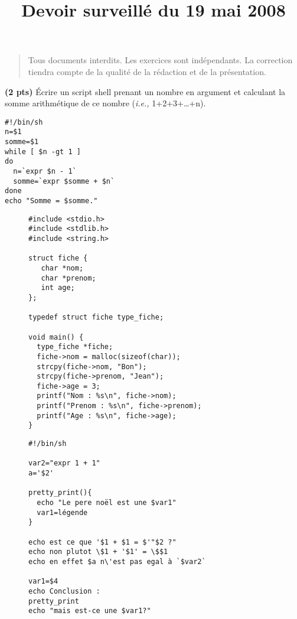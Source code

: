\documentclass[10pt]{article}
\title{Devoir surveillé du 19 mai 2008}
\begin{document}
\maketitle
\thispagestyle{empty}

\begin{quote}
  Tous documents interdits. Les exercices sont indépendants. La correction
  tiendra compte de la qualité de la rédaction et de la présentation.
\end{quote}

\begin{Exercice} \textbf{(2 pts)}
Écrire un script shell prenant un nombre en argument et calculant la somme
arithmétique de ce nombre (\textit{i.e.,} 1+2+3+\ldots+n).

\begin{Reponse}
  \begin{Verbatim}
#!/bin/sh
n=$1
somme=$1
while [ $n -gt 1 ]
do
  n=`expr $n - 1`
  somme=`expr $somme + $n`
done
echo "Somme = $somme."
  \end{Verbatim}
\end{Reponse}
\end{Exercice}

\begin{figure}[b]
  \begin{minipage}{.48\linewidth}   
  \begin{Verbatim}[label=Programme de l'exercice 2]
#include <stdio.h>
#include <stdlib.h>
#include <string.h>

struct fiche {
   char *nom;
   char *prenom;
   int age;
};

typedef struct fiche type_fiche;

void main() {   
  type_fiche *fiche;
  fiche->nom = malloc(sizeof(char));
  strcpy(fiche->nom, "Bon");
  strcpy(fiche->prenom, "Jean");
  fiche->age = 3;
  printf("Nom : %s\n", fiche->nom);
  printf("Prenom : %s\n", fiche->prenom);
  printf("Age : %s\n", fiche->age);
}
      \end{Verbatim}
    \end{minipage}\hfill  %
  \begin{minipage}{.48\linewidth}   
  \begin{Verbatim}[label=Script de l'exercice 3]
#!/bin/sh

var2="expr 1 + 1"
a='$2'

pretty_print(){
  echo "Le pere noël est une $var1"
  var1=légende
}

echo est ce que '$1 + $1 = $'"$2 ?"
echo non plutot \$1 + '$1' = \$$1 
echo en effet $a n\'est pas egal à `$var2`

var1=$4
echo Conclusion :
pretty_print
echo "mais est-ce une $var1?"
  \end{Verbatim}
\end{minipage}
\end{figure}
\end{document}
